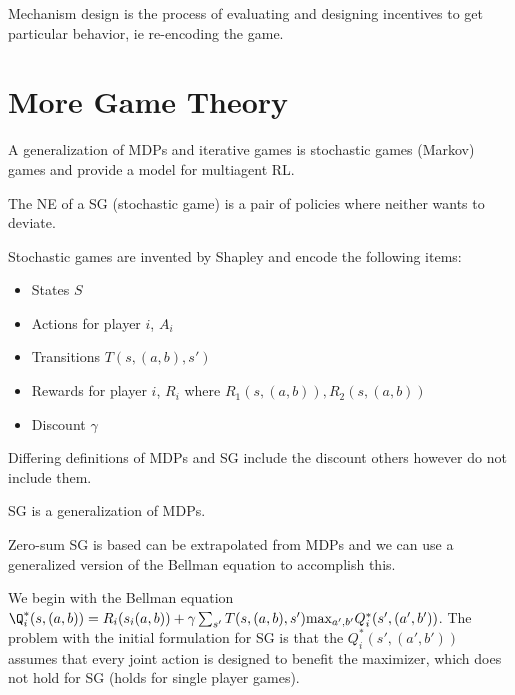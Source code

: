 \documentclass{article}
\begin{document}
Mechanism design is the process of evaluating and designing incentives to
get particular behavior, ie re-encoding the game. 

\section{More Game Theory}

A generalization of MDPs and iterative games is stochastic games (Markov) 
games and provide a model for multiagent RL. 

The NE of a SG (stochastic game) is a pair of policies where neither wants to
deviate. 

Stochastic games are invented by Shapley and encode the following items:
\begin{itemize}
	\item States $S$
	\item Actions for player $i$, $A_i$
	\item Transitions $T(s, (a,b), s')$
	\item Rewards for player $i$, $R_i$ where $R_1(s,(a,b)), R_2(s,(a,b))$
	\item Discount $\gamma$
\end{itemize}

Differing definitions of MDPs and SG include the discount  others however do not
include them. 

SG is a generalization of MDPs. 

Zero-sum SG is based can be extrapolated from MDPs and we can use a generalized
version of the Bellman equation to accomplish this. 

We begin with the Bellman equation $\Q_i^*(s,(a,b)) = R_i(s_i(a,b)) + \gamma
\sum_{s'} T(s,(a,b),s')\text{max}_{a',b'}Q_i^*(s',(a',b'))$. The problem with
the initial formulation for SG is that the $Q^*_i(s',(a',b'))$  assumes that
every joint action is designed to benefit the maximizer, which does not hold for
SG (holds for single player games). 

		
\end{document}
